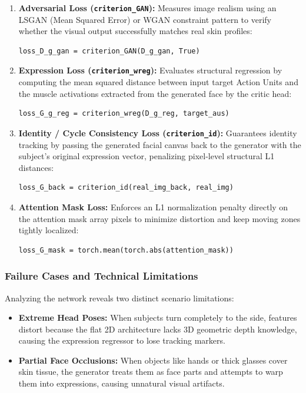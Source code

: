 \documentclass{article}
\begin{document}
\begin{enumerate}
    \item \textbf{Adversarial Loss (\texttt{criterion_GAN}):} Measures image realism using an LSGAN (Mean Squared Error) or WGAN constraint pattern to verify whether the visual output successfully matches real skin profiles:
\begin{verbatim}
loss_D_g_gan = criterion_GAN(D_g_gan, True)
\end{verbatim}
    \item \textbf{Expression Loss (\texttt{criterion_wreg}):} Evaluates structural regression by computing the mean squared distance between input target Action Units and the muscle activations extracted from the generated face by the critic head:
\begin{verbatim}
loss_G_g_reg = criterion_wreg(D_g_reg, target_aus)
\end{verbatim}
    \item \textbf{Identity / Cycle Consistency Loss (\texttt{criterion_id}):} Guarantees identity tracking by passing the generated facial canvas back to the generator with the subject's original expression vector, penalizing pixel-level structural L1 distances:
\begin{verbatim}
loss_G_back = criterion_id(real_img_back, real_img)
\end{verbatim}
    \item \textbf{Attention Mask Loss:} Enforces an L1 normalization penalty directly on the attention mask array pixels to minimize distortion and keep moving zones tightly localized:
\begin{verbatim}
loss_G_mask = torch.mean(torch.abs(attention_mask))
\end{verbatim}
\end{enumerate}

\subsubsection{Failure Cases and Technical Limitations}
Analyzing the network reveals two distinct scenario limitations:
\begin{itemize}
    \item \textbf{Extreme Head Poses:} When subjects turn completely to the side, features distort because the flat 2D architecture lacks 3D geometric depth knowledge, causing the expression regressor to lose tracking markers.
    \item \textbf{Partial Face Occlusions:} When objects like hands or thick glasses cover skin tissue, the generator treats them as face parts and attempts to warp them into expressions, causing unnatural visual artifacts.
\end{itemize}
\end{document}
